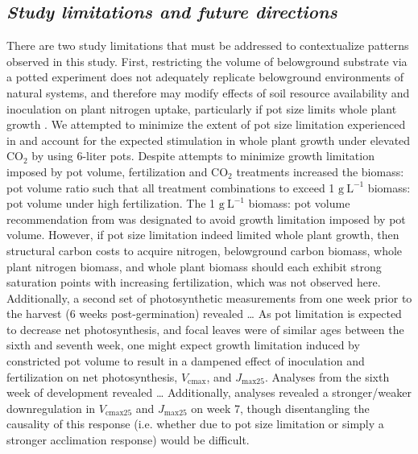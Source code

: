 \subsection{\textit{Study limitations and future directions}}
There are two study limitations that must be addressed to contextualize patterns observed in this study. First, restricting the volume of belowground substrate via a potted experiment does not adequately replicate belowground environments of natural systems, and therefore may modify effects of soil resource availability and inoculation on plant nitrogen uptake, particularly if pot size limits whole plant growth . We attempted to minimize the extent of pot size limitation experienced in  and account for the expected stimulation in whole plant growth under elevated CO$_2$ by using 6-liter pots. Despite attempts to minimize growth limitation imposed by pot volume, fertilization and CO$_2$ treatments increased the biomass: pot volume ratio such that all treatment combinations to exceed 1 $\mathrm{g\ L^{-1}}$ biomass: pot volume under high fertilization. The 1 $\mathrm{g\ L^{-1}}$ biomass: pot volume recommendation from  was designated to avoid growth limitation imposed by pot volume. However, if pot size limitation indeed limited whole plant growth, then structural carbon costs to acquire nitrogen, belowground carbon biomass, whole plant nitrogen biomass, and whole plant biomass should each exhibit strong saturation points with increasing fertilization, which was not observed here. Additionally, a second set of photosynthetic measurements from one week prior to the harvest (6 weeks post-germination) revealed … As pot limitation is expected to decrease net photosynthesis, and focal leaves were of similar ages between the sixth and seventh week, one might expect growth limitation induced by constricted pot volume to result in a dampened effect of inoculation and fertilization on net photosynthesis, $V_\mathrm{cmax}$, and $J_\mathrm{max25}$. Analyses from the sixth week of development revealed … Additionally, analyses revealed a stronger/weaker downregulation in $V_\mathrm{cmax25}$ and $J_\mathrm{max25}$ on week 7, though disentangling the causality of this response (i.e. whether due to pot size limitation or simply a stronger acclimation response) would be difficult.

